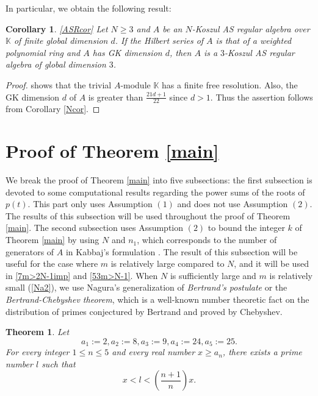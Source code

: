 \documentclass[reqno]{amsart}
\newcommand{\bbK}{\mathbb{K}}
\numberwithin{equation}{section}
\theoremstyle{plain}
\newtheorem{thm}[equation]{Theorem}
\newtheorem{cor}[equation]{Corollary}
\theoremstyle{definition}
\begin{document}
In particular, we obtain the following result:

\begin{cor}\label{AScor}\ref{ASRcor}
    Let $N\geq 3$ and $A$ be an $N$-Koszul AS regular algebra over $\bbK$ of finite global dimension $d$. If the Hilbert series of $A$ is that of a weighted polynomial ring and $A$ has GK dimension $d$, then $A$ is a $3$-Koszul AS regular algebra of global dimension $3$. 
\end{cor}
\begin{proof}
    \cite[Proposition 3.1]{StephensonZhang} shows that the trivial $A$-module $\bbK$ has a finite free resolution. Also, the GK dimension $d$ of $A$ is greater than $\frac{21d+1}{22}$ since $d>1$. Thus the assertion follows from Corollary \ref{Ncor}. 
\end{proof}



\section{Proof of Theorem \ref{main}}

We break the proof of Theorem \ref{main} into five subsections: the first subsection is devoted to some computational results regarding the power sums of the roots of $p(t)$. This part only uses Assumption $(1)$ and does not use Assumption $(2)$. The results of this subsection will be used throughout the proof of Theorem \ref{main}. The second subsection uses Assumption $(2)$ to bound the integer $k$ of Theorem \ref{main} by using $N$ and $n_1$, which corresponds to the number of generators of $A$ in Kabbaj's formulation \cite[Remark 2.2]{Kabbaj}. The result of this subsection will be useful for the case where $m$ is relatively large compared to $N$, and it will be used in \ref{7m>2N-1imp} and \ref{53m>N-1}. When $N$ is sufficiently large and $m$ is relatively small (\ref{Na2}), we use Nagura's generalization of 
\emph{Bertrand's postulate} or
the \emph{Bertrand-Chebyshev theorem}, which is a well-known number theoretic fact on the distribution of primes conjectured by Bertrand and proved by Chebyshev.
\begin{thm}\cite{Nagura}
    Let 
    $$a_1:=2, a_2:=8, a_3:=9, a_4:=24, a_5:=25.$$
    For every integer $1\leq n\leq 5$ and every real number $x\geq a_n$, there exists a prime number $l$ such that
    $$x<l<\left(\frac{n+1}{n}\right)x.$$
\end{thm}

\end{document}
